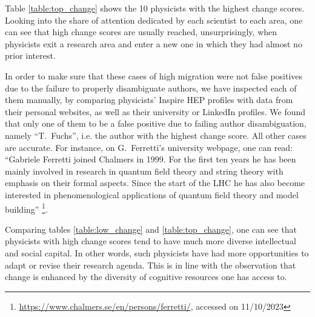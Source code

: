 \documentclass{article}
\begin{document}
Table \ref{table:top_change} shows the 10 physicists with the highest change scores.  Looking into the share of attention dedicated by each scientist to each area, one can see that high change scores are usually reached, unsurprisingly, when physicists exit a research area and enter a new one in which they had almost no prior interest. 

In order to make sure that these cases of high migration were not false positives due to the failure to properly disambiguate authors, we have inspected each of them manually, by comparing physicists' Inspire HEP profiles with data from their personal websites, as well as their university or LinkedIn profiles. We found that only one of them to be a false positive due to failing author disambiguation, namely ``T.~Fuchs'', i.e. the author with the highest change score. All other cases are accurate.
For instance, on G.~Ferretti's university webpage, one can read: ``Gabriele Ferretti joined Chalmers in 1999. For the first ten years he has been mainly involved in research in quantum field theory and string theory with emphasis on their formal aspects. Since the start of the LHC he has also become interested in phenomenological applications of quantum field theory and model building'' \footnote{\url{https://www.chalmers.se/en/persons/ferretti/}, accessed on 11/10/2023}.

Comparing tables \ref{table:low_change} and \ref{table:top_change}, one can see that physicists with high change scores tend to have much more diverse intellectual and social capital. In other words, such physicists have had more opportunities to adapt or revise their research agenda. This is in line with the observation that change is enhanced by the diversity of cognitive resources one has access to.

\fontsize{6}{7}\selectfont\normalsize
\fontsize{6}{7}\selectfont\normalsize
\end{document}
